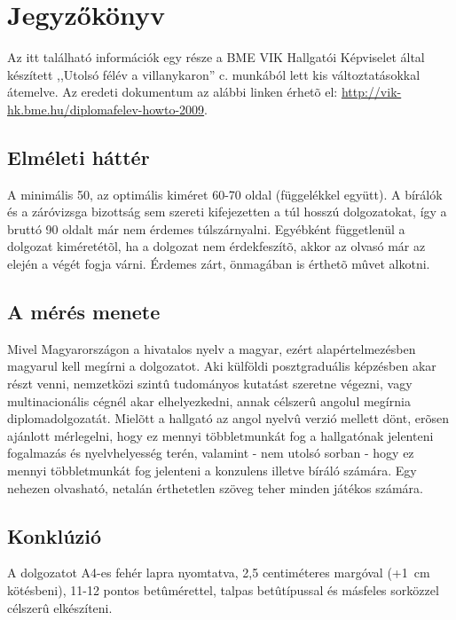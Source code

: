 \chapter{Jegyzőkönyv}
Az itt található információk egy része a BME VIK Hallgatói Képviselet által készített ,,Utolsó félév a villanykaron'' c. munkából lett kis változtatásokkal átemelve. Az eredeti dokumentum az alábbi linken érhetõ el: \url{http://vik-hk.bme.hu/diplomafelev-howto-2009}.

\section{Elméleti háttér}
A minimális 50, az optimális kiméret 60-70 oldal (függelékkel együtt). A bírálók és a záróvizsga bizottság sem szereti kifejezetten a túl hosszú dolgozatokat, így a bruttó 90 oldalt már nem érdemes túlszárnyalni. Egyébként függetlenül a dolgozat kiméretétõl, ha a dolgozat nem érdekfeszítõ, akkor az olvasó már az elején a végét fogja várni. Érdemes zárt, önmagában is érthetõ mûvet alkotni.

\section{A mérés menete}
Mivel Magyarországon a hivatalos nyelv a magyar, ezért alapértelmezésben magyarul kell megírni a dolgozatot. Aki külföldi posztgraduális képzésben akar részt venni, nemzetközi szintû tudományos kutatást szeretne végezni, vagy multinacionális cégnél akar elhelyezkedni, annak célszerû angolul megírnia diplomadolgozatát. Mielõtt a hallgató az angol nyelvû verzió mellett dönt, erõsen ajánlott mérlegelni, hogy ez mennyi többletmunkát fog a hallgatónak jelenteni fogalmazás és nyelvhelyesség terén, valamint - nem utolsó sorban - hogy ez mennyi többletmunkát fog jelenteni a konzulens illetve bíráló számára. Egy nehezen olvasható, netalán érthetetlen szöveg teher minden játékos számára.

\section{Konklúzió}
A dolgozatot A4-es fehér lapra nyomtatva, 2,5 centiméteres margóval (+1~cm kötésbeni), 11-12 pontos betûmérettel, talpas betûtípussal és másfeles sorközzel célszerû elkészíteni.



